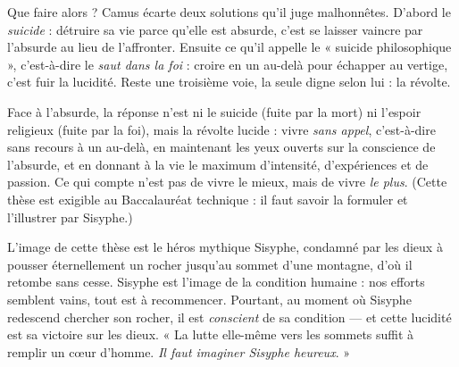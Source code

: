 \documentclass[11pt]{article}
\newcommand{\cle}[1]{{\popxbold\color{popdark}#1}}
\begin{document}
Que faire alors ? Camus écarte deux solutions qu'il juge malhonnêtes. D'abord le \emph{suicide} : détruire sa vie parce qu'elle est absurde, c'est se laisser vaincre par l'absurde au lieu de l'affronter. Ensuite ce qu'il appelle le « suicide philosophique », c'est-à-dire le \emph{saut dans la foi} : croire en un au-delà pour échapper au vertige, c'est fuir la lucidité. Reste une troisième voie, la seule digne selon lui : la \cle{révolte}.

\begin{propriete}
Face à l'absurde, la réponse n'est ni le suicide (fuite par la mort) ni l'espoir religieux (fuite par la foi), mais la \cle{révolte lucide} : vivre \emph{sans appel}, c'est-à-dire sans recours à un au-delà, en maintenant les yeux ouverts sur la conscience de l'absurde, et en donnant à la vie le maximum d'intensité, d'expériences et de passion. Ce qui compte n'est pas de vivre le mieux, mais de vivre \emph{le plus}. (Cette thèse est exigible au Baccalauréat technique : il faut savoir la formuler et l'illustrer par Sisyphe.)
\end{propriete}

L'image de cette thèse est le héros mythique \cle{Sisyphe}, condamné par les dieux à pousser éternellement un rocher jusqu'au sommet d'une montagne, d'où il retombe sans cesse. Sisyphe est l'image de la condition humaine : nos efforts semblent vains, tout est à recommencer. Pourtant, au moment où Sisyphe redescend chercher son rocher, il est \emph{conscient} de sa condition — et cette lucidité est sa victoire sur les dieux. « La lutte elle-même vers les sommets suffit à remplir un cœur d'homme. \emph{Il faut imaginer Sisyphe heureux}. »
\end{document}
